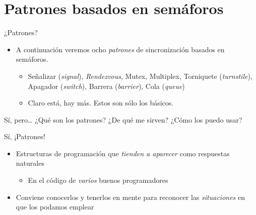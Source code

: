 \documentclass[presentation]{beamer}
\begin{document}
\section{Patrones basados en semáforos}
\label{sec:orgcd76726}
\begin{frame}[label={sec:orgcbe8cd6}]{¿Patrones?}
\begin{itemize}
\item A continuación veremos ocho \emph{patrones} de sincronización basados
en semáforos.
\begin{itemize}
\item Señalizar (\emph{signal}), \emph{Rendezvous}, Mutex, Multiplex, Torniquete
(\emph{turnstile}), Apagador (\emph{switch}), Barrera (\emph{barrier}), Cola
(\emph{queue})
\item Claro está, hay más. Estos son sólo los básicos.
\end{itemize}
\end{itemize}
\begin{center}
Sí, pero\ldots{}
\vfill
¿Qué son los patrones? ¿De qué me sirven? ¿Cómo los puedo usar?
\end{center}
\end{frame}

\begin{frame}[label={sec:org6b084c3}]{Sí, ¡Patrones!}
\begin{itemize}
\item Estructuras de programación que \emph{tienden a aparecer} como respuestas
naturales
\begin{itemize}
\item En el código de \emph{varios} buenos programadores
\end{itemize}
\item Conviene conocerlos y tenerlos en mente para reconocer las
\emph{situaciones} en que los podamos emplear
\end{itemize}
\end{frame}
\end{document}
